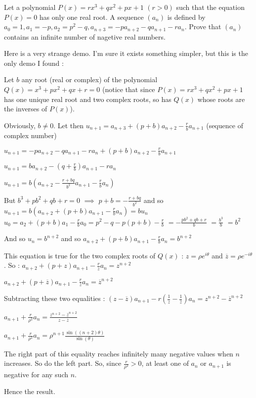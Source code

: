 \begin{solution}
	\begin{tcolorbox}Let a polynomial $ P(x) = rx^3 + qx^2 + px + 1$ $ (r > 0)$ such that the equation $ P(x) = 0$ has only one real root. A sequence $ (a_n)$ is defined by $ a_0 = 1, a_1 = - p, a_2 = p^2 - q, a_{n + 3} = - pa_{n + 2} - qa_{n + 1} - ra_n$.
Prove that $ (a_n)$ contains an infinite number of nagetive real numbers.\end{tcolorbox}

Here is a very strange demo. I'm sure it exists something simpler, but this is the only demo I found :

Let $ b$ any root (real or complex) of the polynomial $ Q(x)=x^3 + px^2 + qx + r = 0$ (notice that since $ P(x)=rx^3+qx^2+px+1$ has one unique real root and two complex roots, so has $ Q(x)$ whose roots are the inverses of $ P(x)$).

Obviously, $ b\neq 0$. Let then $ u_{n+1}=a_{n+3}+(p+b)a_{n+2}-\frac{r}{b}a_{n+1}$ (sequence of complex number)

$ u_{n+1}=-pa_{n+2}-qa_{n+1}-ra_n+(p+b)a_{n+2}-\frac{r}{b}a_{n+1}$

$ u_{n+1}=ba_{n+2}-(q+\frac{r}{b})a_{n+1}-ra_n$

$ u_{n+1}=b(a_{n+2}-\frac{r+bq}{b^2}a_{n+1}-\frac{r}{b}a_n)$

But $ b^3+pb^2+qb+r=0$ $ \implies$ $ p+b=-\frac{r+bq}{b^2}$ and so $ u_{n+1}=b(a_{n+2}+(p+b)a_{n+1}-\frac{r}{b}a_n)=b u_{n}$
$ u_0=a_{2}+(p+b)a_{1}-\frac{r}{b}a_{0}=p^2-q-p(p+b)-\frac{r}{b}$ $ =-\frac{pb^2+qb+r}{b}$ $ =\frac{b^3}{b}$ $ =b^2$

And so $ u_n=b^{n+2}$ and so $ \boxed{a_{n+2}+(p+b)a_{n+1}-\frac{r}{b}a_{n}=b^{n+2}}$

This equation is true for the two complex roots of $ Q(x)$ : $ z=\rho e^{i\theta}$ and $ \overline{z}=\rho e^{-i\theta}$. So :
$ a_{n+2}+(p+z)a_{n+1}-\frac{r}{z}a_{n}=z^{n+2}$

$ a_{n+2}+(p+\overline{z})a_{n+1}-\frac{r}{\overline{z}}a_{n}=\overline{z}^{n+2}$

Subtracting these two equalities :
$ (z-\overline{z})a_{n+1}-r(\frac{1}{z}-\frac{1}{\overline{z}})a_{n}=z^{n+2}-\overline{z}^{n+2}$

$ a_{n+1}+\frac{r}{\rho^2}a_{n}=\frac{z^{n+2}-\overline{z}^{n+2}}{z-\overline{z}}$

$ a_{n+1}+\frac{r}{\rho^2}a_{n}=\rho^{n+1}\frac{\sin((n+2)\theta)}{\sin(\theta)}$

The right part of this equality reaches infinitely many negative values when $ n$ increases. So do the left part.
So, since $ \frac{r}{\rho^2}>0$, at least one of $ a_n$ or $ a_{n+1}$ is negative for any such $ n$.

Hence the result.
\end{solution}




